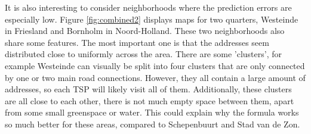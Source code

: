 It is also interesting to consider neighborhoods where the prediction errors are especially low. Figure \ref{fig:combined2} displays maps for two quarters,
Westeinde in Friesland and Bornholm in Noord-Holland. These two neighborhoods also share some features. The most important one is that the addresses seem
distributed close to uniformly across the area. There are some 'clusters', for example Westeinde can visually be split into four clusters that are only
connected by one or two main road connections. However, they all contain a large amount of addresses, so each TSP will likely visit all of them. Additionally,
these clusters are all close to each other, there is not much empty space between them, apart from some small greenspace or water. This could explain why the
formula works so much better for these areas, compared to Schepenbuurt and Stad van de Zon.
